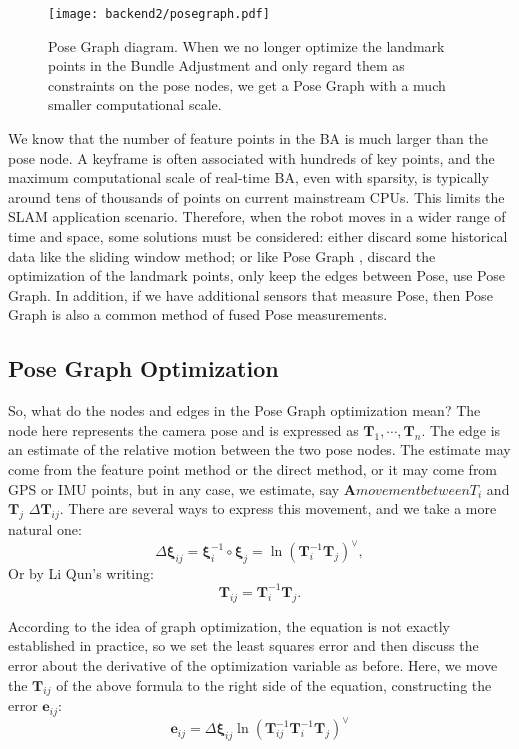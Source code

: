 \begin{figure}[!ht]
\centering
\texttt{[image: backend2/posegraph.pdf]}
\caption{Pose Graph diagram. When we no longer optimize the landmark points in the Bundle Adjustment and only regard them as constraints on the pose nodes, we get a Pose Graph with a much smaller computational scale. }
\label{fig:pose-graph}
\end{figure}

We know that the number of feature points in the BA is much larger than the pose node. A keyframe is often associated with hundreds of key points, and the maximum computational scale of real-time BA, even with sparsity, is typically around tens of thousands of points on current mainstream CPUs. This limits the SLAM application scenario. Therefore, when the robot moves in a wider range of time and space, some solutions must be considered: either discard some historical data \textsuperscript{\cite{Strasdat2011}} like the sliding window method; or like Pose Graph , discard the optimization of the landmark points, only keep the edges between Pose, use Pose Graph\textsuperscript{\cite{Dubbelman2015, Lee2014, Latif2013}}. In addition, if we have additional sensors that measure Pose, then Pose Graph is also a common method of fused Pose measurements.


\subsection{Pose Graph Optimization}
So, what do the nodes and edges in the Pose Graph optimization mean? The node here represents the camera pose and is expressed as $\bm{T}_1, \cdots, \bm{T}_n$. The edge is an estimate of the relative motion between the two pose nodes. The estimate may come from the feature point method or the direct method, or it may come from GPS or IMU points, but in any case, we estimate, say $\bm A movement between {T}_i$ and $\bm{T}_j$ $\Delta \bm{T}_{ij}$. There are several ways to express this movement, and we take a more natural one:
\begin{equation}
\Delta \bm{\xi}_{ij} = \bm{\xi}_i^{-1} \circ \bm{\xi}_j = \ln \left( \bm{T}_i^{-1} \bm{T}_j \right)^\vee,
\end{equation}
Or by Li Qun's writing:
\begin{equation}
\bm{T}_{ij} =\bm{T}_i^{-1} \bm{T}_j.
\end{equation}

According to the idea of ​​graph optimization, the equation is not exactly established in practice, so we set the least squares error and then discuss the error about the derivative of the optimization variable as before. Here, we move the $\bm{T}_{ij}$ of the above formula to the right side of the equation, constructing the error $\bm{e}_{ij}$:
\begin{equation}
\bm{e}_{ij} = \Delta \bm{\xi}_{ij} \ln \left( \bm{T}_{ij}^{-1} \bm{T}_i^{-1} \bm{T}_j \right)^\vee
\end{equation}

